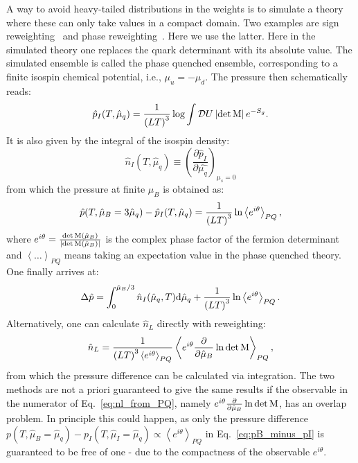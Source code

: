 \documentclass[twocolumn,showpacs,preprintnumbers,amsmath,amssymb,latexsym,prl,footinbib,floatfix,superscriptaddress]{revtex4-2}
\begin{document}
A way to avoid heavy-tailed distributions in the weights is to simulate a theory where 
these can only take values 
in a compact domain. Two examples are sign 
reweighting~\cite{deForcrand:2002pa,Alexandru:2005ix,Giordano:2020roi,Borsanyi:2021hbk}
and phase reweighting~\cite{Fodor:2007vv,Endrodi:2018zda,Borsanyi:2021hbk}. 
Here we use the latter.
Here in the simulated theory 
one replaces the quark determinant with its 
absolute value.
The simulated ensemble is called the phase quenched ensemble,
corresponding to a finite isospin chemical potential, i.e., $\mu_u=-\mu_d$. 
The pressure then schematically reads: 
\begin{equation}
    \hat{p}_I (T,\hat{\mu}_q) = \frac{1}{\left(LT\right)^3} \log \int \mathcal{D} U \left| \det {\rm{M}} \right| e^{-S_g}\rm{.}
\end{equation}
It is also given by the integral of the isospin density:
\begin{equation}
    \hat{n}_I (T, \hat{\mu}_q)  \equiv \left( \frac{\partial \hat{p}_I }{\partial \hat{\mu_q}} \right)_{\mu_s=0}
\end{equation}
from which the pressure at finite $\mu_B$
is obtained as: 
\begin{equation}
    \label{eq:pB_minus_pI}
    \hat{p}(T,\hat{\mu}_B=3\hat{\mu}_q) - \hat{p}_I(T,\hat{\mu}_q) = \frac{1}{\left( LT \right) ^3} \ln \left\langle e^{i \theta} \right\rangle_{PQ} \rm{,}
\end{equation}
where $e^{i \theta} = \frac{\det {\rm{M}}(\hat{\mu}_B)}{\left| \det {\rm{M}}(\hat{\mu}_B) \right|}$ 
is the complex phase factor of the fermion determinant and $\left\langle \dots \right\rangle_{PQ}$ means taking an expectation
value in the phase quenched theory. One finally
arrives at:
\begin{equation}
    \label{eq:pB_from_PQweights}
    \Delta \hat{p} = \int_{0}^{\hat{\mu}_B/3} \hat{n}_I (\hat{\mu}_q, T) {\rm{d}} \hat{\mu}_q 
    +
    \frac{1}{\left( LT \right)^3} \ln \left\langle e^{i \theta} \right\rangle_{PQ}
    \rm{.} 
\end{equation}
Alternatively, one can calculate $\hat{n}_L$ directly with reweighting: 
\begin{equation}
    \label{eq:nl_from_PQ}
    \hat{n}_L = \frac{1}{\left( LT \right)^3 \left\langle e^{i \theta} \right\rangle_{PQ}}
    \left\langle e^{i \theta} \frac{\partial}{\partial \hat{\mu}_B} \ln \det \rm{M} \right\rangle_{PQ}
    \rm{,}
\end{equation}
from which the pressure difference can be calculated via integration. 
The two methods are not a priori guaranteed to give the same results 
if the observable in the numerator of Eq.~\eqref{eq:nl_from_PQ}, namely 
$e^{i \theta} \frac{\partial}{\partial \hat{\mu}_B} \ln \det \rm{M}$, has an overlap problem. 
In principle this could happen, as only the pressure 
difference $p(T,\hat{\mu}_B=\hat{\mu}_q) - p_I(T,\hat{\mu}_I=\hat{\mu}_q) \propto \left\langle e^{i \theta} \right\rangle_{PQ}$ in 
Eq.~\eqref{eq:pB_minus_pI} is guaranteed to be free of one - due to the compactness of the observable $e^{i \theta}$.
\end{document}
